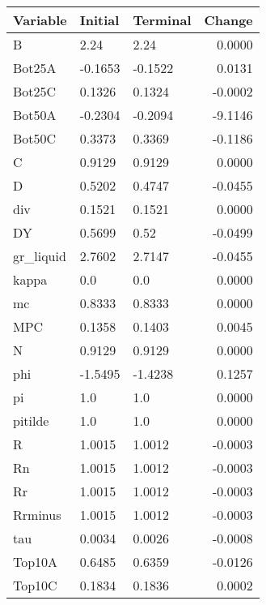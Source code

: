 \begin{table}
\centering
\label{tab:stst_comparison_low_B_limit_permanent}
\begin{tabular}{lllr}
\toprule
                Variable & Initial & Terminal &  Change \\
\midrule
                       B &    2.24 &     2.24 &  0.0000 \\
                  Bot25A & -0.1653 &  -0.1522 &  0.0131 \\
                  Bot25C &  0.1326 &   0.1324 & -0.0002 \\
                  Bot50A & -0.2304 &  -0.2094 & -9.1146 \\
                  Bot50C &  0.3373 &   0.3369 & -0.1186 \\
                       C &  0.9129 &   0.9129 &  0.0000 \\
                       D &  0.5202 &   0.4747 & -0.0455 \\
                     div &  0.1521 &   0.1521 &  0.0000 \\
                      DY &  0.5699 &     0.52 & -0.0499 \\
               gr\_liquid &  2.7602 &   2.7147 & -0.0455 \\
                   kappa &     0.0 &      0.0 &  0.0000 \\
                      mc &  0.8333 &   0.8333 &  0.0000 \\
                     MPC &  0.1358 &   0.1403 &  0.0045 \\
                       N &  0.9129 &   0.9129 &  0.0000 \\
                     phi & -1.5495 &  -1.4238 &  0.1257 \\
                      pi &     1.0 &      1.0 &  0.0000 \\
                 pitilde &     1.0 &      1.0 &  0.0000 \\
                       R &  1.0015 &   1.0012 & -0.0003 \\
                      Rn &  1.0015 &   1.0012 & -0.0003 \\
                      Rr &  1.0015 &   1.0012 & -0.0003 \\
                 Rrminus &  1.0015 &   1.0012 & -0.0003 \\
                     tau &  0.0034 &   0.0026 & -0.0008 \\
                  Top10A &  0.6485 &   0.6359 & -0.0126 \\
                  Top10C &  0.1834 &   0.1836 &  0.0002 \\

\end{tabular}
\end{table}
